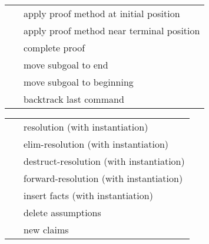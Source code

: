 \begin{isabellebody}
\begin{isamarkuptext}
\end{isamarkuptext}%
\isamarkuptrue%
%
\isamarkuptrue%
%
\isamarkuptrue%
%
\begin{isamarkuptext}%
\begin{tabular}{ll}
    \hyperlink{command.apply}{\mbox{\isa{\isacommand{apply}}}}~\isa{m} & apply proof method at initial position \\
    \hyperlink{command.apply-end}{\mbox{\isa{\isacommand{apply{\isacharunderscore}end}}}}~\isa{m} & apply proof method near terminal position \\
    \hyperlink{command.done}{\mbox{\isa{\isacommand{done}}}} & complete proof \\
    \hyperlink{command.defer}{\mbox{\isa{\isacommand{defer}}}}~\isa{n} & move subgoal to end \\
    \hyperlink{command.prefer}{\mbox{\isa{\isacommand{prefer}}}}~\isa{n} & move subgoal to beginning \\
    \hyperlink{command.back}{\mbox{\isa{\isacommand{back}}}} & backtrack last command \\
  \end{tabular}%
\end{isamarkuptext}%
\isamarkuptrue%
%
\isamarkuptrue%
%
\begin{isamarkuptext}%
\begin{tabular}{ll}
    \hyperlink{method.rule-tac}{\mbox{\isa{rule{\isacharunderscore}tac}}}~\isa{insts} & resolution (with instantiation) \\
    \hyperlink{method.erule-tac}{\mbox{\isa{erule{\isacharunderscore}tac}}}~\isa{insts} & elim-resolution (with instantiation) \\
    \hyperlink{method.drule-tac}{\mbox{\isa{drule{\isacharunderscore}tac}}}~\isa{insts} & destruct-resolution (with instantiation) \\
    \hyperlink{method.frule-tac}{\mbox{\isa{frule{\isacharunderscore}tac}}}~\isa{insts} & forward-resolution (with instantiation) \\
    \hyperlink{method.cut-tac}{\mbox{\isa{cut{\isacharunderscore}tac}}}~\isa{insts} & insert facts (with instantiation) \\
    \hyperlink{method.thin-tac}{\mbox{\isa{thin{\isacharunderscore}tac}}}~\isa{{\isasymphi}} & delete assumptions \\
    \hyperlink{method.subgoal-tac}{\mbox{\isa{subgoal{\isacharunderscore}tac}}}~\isa{{\isasymphi}} & new claims \\

\end{tabular}
\end{isamarkuptext}
\end{isabellebody}

